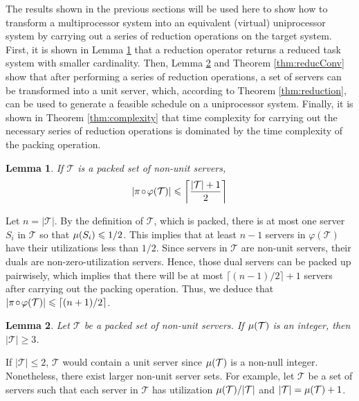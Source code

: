 \documentclass[twocolumn, compsocconf]{IEEEtran}
\newtheorem{lemma}{Lemma}[section]
\newcommand{\comp}{\mbox{\ensuremath{\mspace{2mu}\circ\mspace{2mu}}}}
\renewcommand{\leq}{\leqslant}
\renewcommand{\geq}{\geqslant}
\newcommand{\dual}{\ensuremath{\varphi}}
\newcommand{\pack}{\ensuremath{\pi}}
\newcommand{\servSet}{\ensuremath{\mathcal{T}}}
\newcounter{proc}
\begin{document}
The results shown in the previous sections will be used here to show how to
transform a multiprocessor system into an equivalent (virtual) uniprocessor
system by carrying out a series of reduction operations on the target system.
First, it is shown in Lemma \ref{lem:reducConv} that a reduction operator
returns a reduced task system with smaller cardinality.
Then, Lemma \ref{lem:threeSetInteger} and Theorem \ref{thm:reducConv} show that
after performing a series of reduction operations, a set of servers can be
transformed into a unit server, which, according to Theorem \ref{thm:reduction},
can be used to generate a feasible schedule on a uniprocessor system. Finally,
it is shown in Theorem \ref{thm:complexity} that time complexity for carrying
out the necessary series of reduction operations is dominated by the time
complexity of the packing operation.

\begin{lemma}\label{lem:reducConv}
  If $\servSet$ is a packed set of non-unit servers,
  \[
  | \pack \comp \dual(\servSet) | \leq \left \lceil \frac{|\servSet| + 1}{2}
  \right \rceil
  \]
\end{lemma}

\begin{IEEEproof}
  Let $n = |\servSet|$. By the definition of $\servSet$, which is packed, there
  is at most one server $S_i$ in $\servSet$ so that $\mu(S_i) \leqslant
  1/2$. This implies that at least $n-1$ servers in $\dual(\servSet)$ have their
  utilizations less than $1/2$. Since servers in $\servSet$ are non-unit
  servers, their duals are non-zero-utilization servers. Hence, those dual
  servers can be packed up pairwisely, which implies that there will be at most
  $\lceil (n-1)/2 \rceil + 1$ servers after carrying out the packing operation.
  Thus, we deduce that $|\pack \comp \dual(\servSet)| \leq \lceil (n+1)/2
  \rceil$.
\end{IEEEproof}

\begin{lemma}\label{lem:threeSetInteger}
  Let $\servSet$ be a packed set of non-unit servers. If $\util(\servSet)$ is
  an integer, then $|\servSet| \geq 3$.
\end{lemma}


\begin{IEEEproof}
  If $|\servSet| \leq 2$, $\servSet$ would contain a unit server since
  $\util(\servSet)$ is a non-null integer. $\,$ Nonetheless, there exist
  larger non-unit server sets. For example, let $\servSet$ be a set of
  servers such that each server in $\servSet$ has utilization
  $\util(\servSet)/|\servSet|$ and $|\servSet| = \util(\servSet) + 1$.
\end{IEEEproof}
\end{document}
